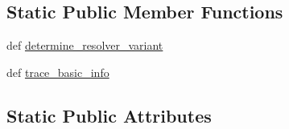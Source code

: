 \subsection*{Static Public Member Functions}
\begin{DoxyCompactItemize}
\item 
def \hyperlink{classpip_1_1__internal_1_1cli_1_1req__command_1_1RequirementCommand_ac040cb38b21acdf2dedfc5ea3318a559}{determine\+\_\+resolver\+\_\+variant}
\item 
def \hyperlink{classpip_1_1__internal_1_1cli_1_1req__command_1_1RequirementCommand_a6abdfdb513ac7ba9c7f698b5c5db798e}{trace\+\_\+basic\+\_\+info}
\end{DoxyCompactItemize}
\subsection*{Static Public Attributes}
